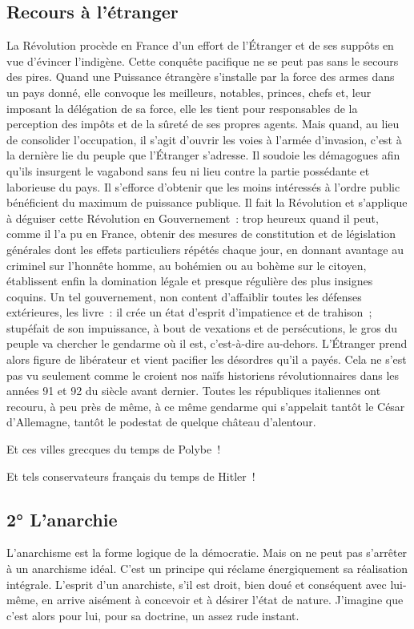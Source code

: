 \documentclass[french,twoside]{book} %
\newcommand{\astermono}{\medskip\centerline{\color{rubric}\large\selectfont{\syms ✻}}\medskip\par}%
\begin{document}
\subsection[Recours à l’étranger]{Recours à l’étranger}
\noindent La Révolution procède en France d’un effort de l’Étranger et de ses suppôts en vue d’évincer l’indigène. Cette conquête pacifique ne se peut pas sans le secours des pires. Quand une Puissance étrangère s’installe par la force des armes dans un pays donné, elle convoque les meilleurs, notables, princes, chefs et, leur imposant la délégation de sa force, elle les tient pour responsables de la perception des impôts et de la sûreté de ses propres agents. Mais quand, au lieu de consolider l’occupation, il s’agit d’ouvrir les voies à l’armée d’invasion, c’est à la dernière lie du peuple que l’Étranger s’adresse. Il soudoie les démagogues afin qu’ils insurgent le vagabond sans feu ni lieu contre la partie possédante et laborieuse du pays. Il s’efforce d’obtenir que les moins intéressés à l’ordre public bénéficient du maximum de puissance publique. Il fait la Révolution et s’applique à déguiser cette Révolution en Gouvernement : trop heureux quand il peut, comme il l’a pu en France, obtenir des mesures de constitution et de législation générales dont les effets particuliers répétés chaque jour, en donnant avantage au criminel sur l’honnête homme, au bohémien ou au bohème sur le citoyen, établissent enfin la domination légale et presque régulière des plus insignes coquins. Un tel gouvernement, non content d’affaiblir toutes les défenses extérieures, les livre : il crée un état d’esprit d’impatience et de trahison ; stupéfait de son impuissance, à bout de vexations et de persécutions, le gros du peuple va chercher le gendarme où il est, c’est-à-dire au-dehors. L’Étranger prend alors figure de libérateur et vient pacifier les désordres qu’il a payés. Cela ne s’est pas vu seulement comme le croient nos naïfs historiens révolutionnaires dans les années 91 et 92 du siècle avant dernier. Toutes les républiques italiennes ont recouru, à peu près de même, à ce même gendarme qui s’appelait tantôt le César d’Allemagne, tantôt le podestat de quelque château d’alentour.\par
Et ces villes grecques du temps de Polybe !\par
Et tels conservateurs français du temps de Hitler !\par

\astermono

\subsection[2° L’anarchie]{2° L’anarchie}
\noindent L’anarchisme est la forme logique de la démocratie. Mais on ne peut pas s’arrêter à un anarchisme idéal. C’est un principe qui réclame énergiquement sa réalisation intégrale. L’esprit d’un anarchiste, s’il est droit, bien doué et conséquent avec lui-même, en arrive aisément à concevoir et à désirer l’état de nature. J’imagine que c’est alors pour lui, pour sa doctrine, un assez rude instant.\par
\end{document}
